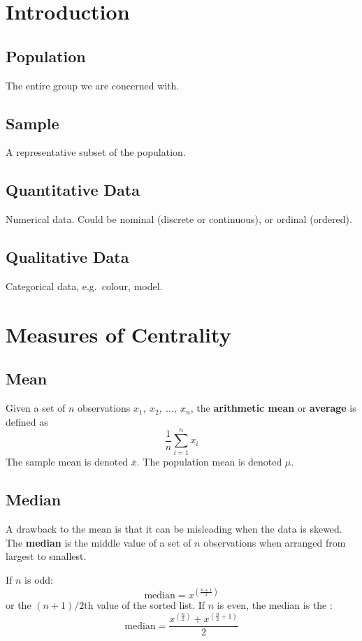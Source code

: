 \documentclass{article}
\begin{document}
\begin{multicols}{3}
    \section{Introduction}
    \subsection{Population}
    The entire group we are concerned with.
    \subsection{Sample}
    A representative subset of the population.
    \subsection{Quantitative Data}
    Numerical data.
    Could be nominal (discrete or continuous), or ordinal (ordered).
    \subsection{Qualitative Data}
    Categorical data, e.g.\ colour, model.

\section{Measures of Centrality}
\subsection{Mean}
Given a set of \(n\) observations \(x_1,\: x_2,\: \ldots,\: x_n\), the \textbf{arithmetic mean}
or \textbf{average} is defined as
\begin{equation*}
    \frac{1}{n} \sum_{i = 1}^n x_i
\end{equation*}
The sample mean is denoted \(\overline{x}\).
The population mean is denoted \(\mu\).
\subsection{Median}
A drawback to the mean is that it can be misleading when the data is skewed.
The \textbf{median} is the middle value of a set of \(n\) observations when arranged
from largest to smallest.

If \(n\) is odd:
\begin{equation*}
    \text{median} = x^{\left( \frac{n + 1}{2} \right)}
\end{equation*}
or the \(\left( n + 1 \right) / 2\)th value of the sorted list.
If \(n\) is even, the median is the :
\begin{equation*}
    \text{median} = \frac{x^{\left( \frac{n}{2} \right)} + x^{\left( \frac{n}{2} + 1 \right)}}{2}
\end{equation*}

\end{multicols}
\end{document}
